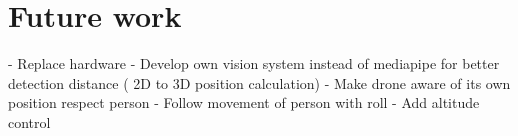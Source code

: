 \section{Future work}
\label{sec:fut-work}




- Replace hardware
- Develop own vision system instead of mediapipe for better detection distance ( 2D to 3D position calculation)
- Make drone aware of its own position respect person
- Follow movement of person with roll
- Add altitude control


